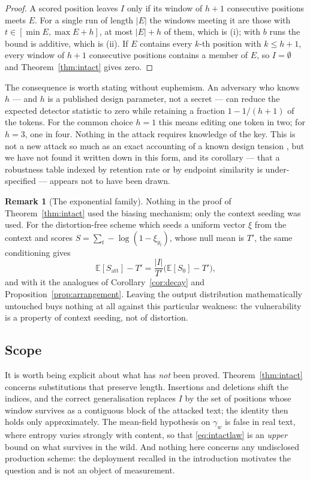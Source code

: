 \documentclass{article}
\theoremstyle{plain}
\theoremstyle{definition}
\newtheorem{remark}[theorem]{Remark}
\numberwithin{equation}{section}
\begin{document}
\begin{proof}
A scored position leaves $I$ only if its window of $h+1$ consecutive
positions meets $E$. For a single run of length $|E|$ the windows
meeting it are those with $t \in [\min E, \max E + h]$, at most
$|E|+h$ of them, which is (i); with $b$ runs the bound is additive,
which is (ii). If $E$ contains every $k$-th position with $k \le h+1$,
every window of $h+1$ consecutive positions contains a member of $E$, so
$I=\emptyset$ and Theorem~\ref{thm:intact} gives zero.
\end{proof}

The consequence is worth stating without euphemism. An adversary who
knows $h$ --- and $h$ is a published design parameter, not a secret ---
can reduce the expected detector statistic to zero while retaining a
fraction $1 - 1/(h+1)$ of the tokens. For the common choice $h=1$ this
means editing one token in two; for $h=3$, one in four. Nothing in the
attack requires knowledge of the key. This is not a new attack so much
as an exact accounting of a known design tension \cite{KGW24, NFL24},
but we have not found it written down in this form, and its corollary
--- that a robustness table indexed by retention rate or by endpoint
similarity is under-specified --- appears not to have been drawn.

\begin{remark}[The exponential family]\label{rem:exp}
Nothing in the proof of Theorem~\ref{thm:intact} used the biasing
mechanism; only the context seeding was used. For the distortion-free
scheme which seeds a uniform vector $\xi$ from the context and scores
$S = \sum_t -\log(1-\xi_{y_t})$, whose null mean is $T'$, the same
conditioning gives
\begin{equation}\label{eq:expfamily}
\mathbb{E}[S_{\mathrm{att}}] - T'
= \frac{|I|}{T'}\bigl(\mathbb{E}[S_0] - T'\bigr),
\end{equation}
and with it the analogues of Corollary~\ref{cor:decay} and
Proposition~\ref{prop:arrangement}. Leaving the output distribution
mathematically untouched buys nothing at all against this particular
weakness: the vulnerability is a property of context seeding, not of
distortion.
\end{remark}

\subsection{Scope}

It is worth being explicit about what has \emph{not} been proved.
Theorem~\ref{thm:intact} concerns substitutions that preserve length.
Insertions and deletions shift the indices, and the correct
generalisation replaces $I$ by the set of positions whose window
survives as a contiguous block of the attacked text; the identity then
holds only approximately. The mean-field hypothesis on $\gamma_w$ is
false in real text, where entropy varies strongly with content, so that
\eqref{eq:intactlaw} is an \emph{upper} bound on what survives in the
wild. And nothing here concerns any undisclosed production scheme: the
deployment recalled in the introduction motivates the question and is
not an object of measurement.
\end{document}
